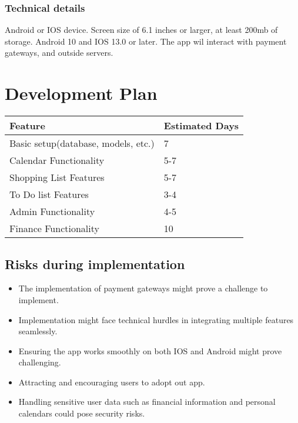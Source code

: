 \documentclass[12pt]{article}
\begin{document}
\subsubsection{Technical details}

Android or IOS device. Screen size of 6.1 inches or larger, at least 200mb of storage.
Android 10 and IOS 13.0 or later. The app wil interact with payment gateways, and outside servers. 


\section{Development Plan}

\begin{table}[h]
    \begin{tabularx}{\textwidth}{|X|p{100pt}|}
        \hline  Feature & Estimated Days \\
        \hline  Basic setup(database, models, etc.) & 7 \\
        \hline  Calendar Functionality & 5-7 \\
        \hline  Shopping List Features & 5-7 \\
        \hline  To Do list Features & 3-4 \\
        \hline  Admin Functionality & 4-5 \\
        \hline  Finance Functionality & 10 \\
        \hline
    \end{tabularx}
\end{table}

\subsection{Risks during implementation}
\begin{itemize}
    \setlength\itemsep{-1em}
    \item   The implementation of payment gateways might prove a challenge to implement. \\
    \item   Implementation might face technical hurdles in integrating multiple features seamlessly. \\ 
    \item   Ensuring the app works smoothly on both IOS and Android might prove challenging. \\ 
    \item   Attracting and encouraging users to adopt out app. \\
    \item   Handling sensitive user data such as financial information and personal calendars could pose security risks. \\
\end{itemize}
\end{document}
